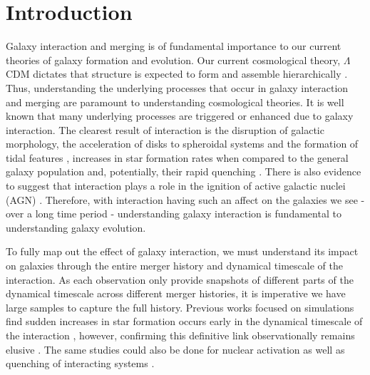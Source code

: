 \section{Introduction}\label{introduction}
\noindent Galaxy interaction and merging is of fundamental importance to our current theories of galaxy formation and evolution. Our current cosmological theory, $\Lambda$CDM dictates that structure is expected to form and assemble hierarchically \citep{1978MNRAS.183..341W, 2001MNRAS.328..726S, 2013MNRAS.436.1765M}. Thus, understanding the underlying processes that occur in galaxy interaction and merging are paramount to understanding cosmological theories. It is well known that many underlying processes are triggered or enhanced due to galaxy interaction. The clearest result of interaction is the disruption of galactic morphology, the acceleration of disks to spheroidal systems and the formation of tidal features \citep{1972ApJ...178..623T, 1977ApJ...212..616T, 2005MNRAS.357..753G, 2009MNRAS.397..802H}, increases in star formation rates when compared to the general galaxy population \citep{1991ApJ...370L..65B, 2006ApJ...652...56B, 2014MNRAS.437.2137S, 2015ApJ...807L..16K} and, potentially, their rapid quenching \citep{2013MNRAS.430.1901H, 2023RAA....23i5026D}. There is also evidence to suggest that interaction plays a role in the ignition of active galactic nuclei (AGN) \citep{2011MNRAS.418.2043E, 2015ApJ...806..219C, 2023MNRAS.523.4164H}. Therefore, with interaction having such an affect on the galaxies we see - over a long time period - understanding galaxy interaction is fundamental to understanding galaxy evolution.

To fully map out the effect of galaxy interaction, we must understand its impact on galaxies through the entire merger history and dynamical timescale of the interaction. As each observation only provide snapshots of different parts of the dynamical timescale across different merger histories, it is imperative we have large samples to capture the full history. Previous works focused on simulations find sudden increases in star formation occurs early in the dynamical timescale of the interaction \citep{2008MNRAS.384..386C, 2019MNRAS.490.2139R}, however, confirming this definitive link observationally remains elusive \citep{2023ApJ...958...96R}. The same studies could also be done for nuclear activation as well as quenching of interacting systems \citep{2011MNRAS.418.2043E, 2018PASJ...70S..37G, 2023ApJ...942..107S}. 

